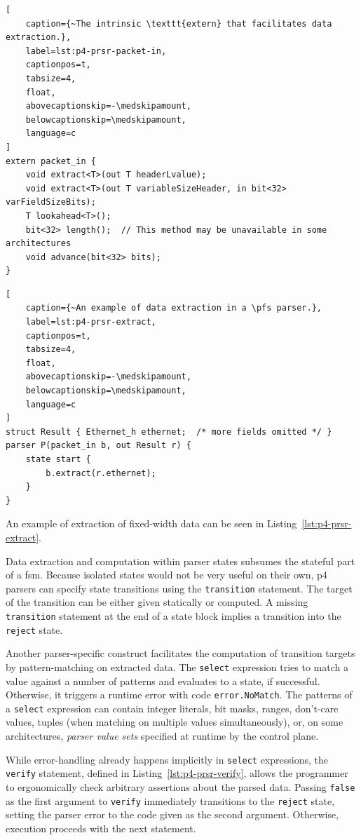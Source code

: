 \begin{lstlisting}[
	caption={~The intrinsic \texttt{extern} that facilitates data extraction.},
	label=lst:p4-prsr-packet-in,
	captionpos=t,
	tabsize=4,
	float,
	abovecaptionskip=-\medskipamount,
	belowcaptionskip=\medskipamount,
	language=c
]
extern packet_in {
	void extract<T>(out T headerLvalue);
	void extract<T>(out T variableSizeHeader, in bit<32> varFieldSizeBits);
	T lookahead<T>();
	bit<32> length();  // This method may be unavailable in some architectures
	void advance(bit<32> bits);
}
\end{lstlisting}

\begin{lstlisting}[
	caption={~An example of data extraction in a \pfs parser.},
	label=lst:p4-prsr-extract,
	captionpos=t,
	tabsize=4,
	float,
	abovecaptionskip=-\medskipamount,
	belowcaptionskip=\medskipamount,
	language=c
]
struct Result { Ethernet_h ethernet;  /* more fields omitted */ }
parser P(packet_in b, out Result r) {
	state start {
		b.extract(r.ethernet);
	}
}
\end{lstlisting}

An example of extraction of fixed-width data can be seen in
Listing~\ref{lst:p4-prsr-extract}.

Data extraction and computation within parser states subsumes the stateful part
of a \acrlong{fsm}. Because isolated states would not be very useful on their
own, \acrshort{p4} parsers can specify state transitions using the
\texttt{transition} statement. The target of the transition can be either given
statically or computed. A missing \texttt{transition} statement at the end of a
state block implies a transition into the \texttt{reject} state.

Another parser-specific construct facilitates the computation of transition
targets by pattern-matching on extracted data. The \texttt{select} expression
tries to match a value against a number of patterns and evaluates to a state, if
successful. Otherwise, it triggers a runtime error with code
\texttt{error.NoMatch}. The patterns of a \texttt{select} expression can contain
integer literals, bit masks, ranges, don't-care values, tuples (when matching on
multiple values simultaneously), or, on some architectures, \textit{parser value
sets} specified at runtime by the control plane.

While error-handling already happens implicitly in \texttt{select} expressions,
the \texttt{verify} statement, defined in Listing~\ref{lst:p4-prsr-verify},
allows the programmer to ergonomically check arbitrary assertions about the
parsed data. Passing \texttt{false} as the first argument to \texttt{verify}
immediately transitions to the \texttt{reject} state, setting the parser error
to the code given as the second argument. Otherwise, execution proceeds with the
next statement.

